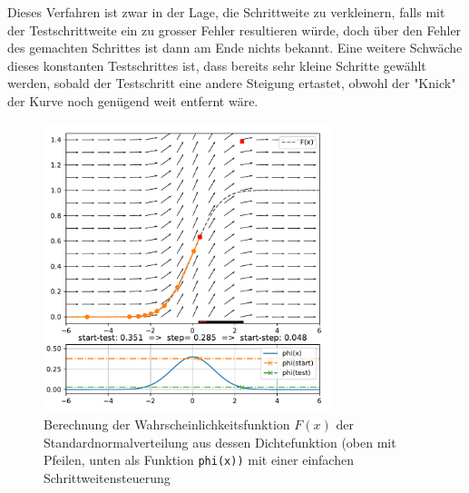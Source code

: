 Dieses Verfahren ist zwar in der Lage, die Schrittweite zu verkleinern, falls mit der Testschrittweite ein zu grosser Fehler resultieren würde,
doch über den Fehler des gemachten Schrittes ist dann am Ende nichts bekannt.
Eine weitere Schwäche dieses konstanten Testschrittes ist, dass bereits sehr kleine Schritte gewählt werden,
sobald der Testschritt eine andere Steigung ertastet, obwohl der "Knick" der Kurve noch genügend weit entfernt wäre.

\begin{figure}
  \centering
  \includegraphics[width=0.75\textwidth]{papers/steps/img/ssc.pdf}
  \caption{Berechnung der Wahrscheinlichkeitsfunktion $F(x)$ der Standardnormalverteilung aus dessen Dichtefunktion
    (oben mit Pfeilen, unten als Funktion \texttt{phi(x))} mit einer einfachen Schrittweitensteuerung
    \label{buch:steps:examplessc}}
\end{figure}


